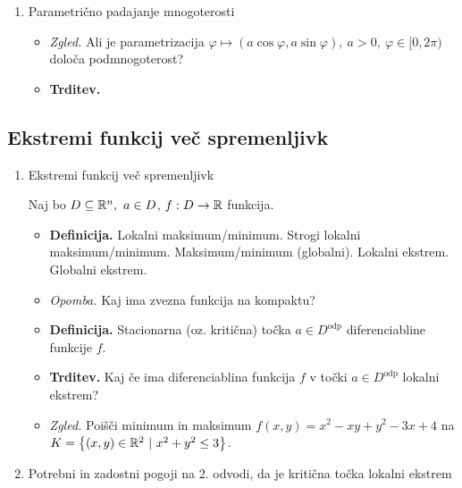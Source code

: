 \begin{enumerate}
    \item Parametrično padajanje mnogoterosti
    \begin{itemize}
        \item \colorbox{yellow!30}{\emph{Zgled.}} Ali je parametrizacija $\varphi \mapsto (a \cos \varphi, a \sin \varphi), \ a > 0, \ \varphi \in [0, 2 \pi)$ določa podmnogoterost?
        \item \colorbox{blue!30}{\textbf{Trditev.}}
    \end{itemize}
\end{enumerate}

\newpage
\subsection{Ekstremi funkcij več spremenljivk}
\begin{enumerate}
    \item Ekstremi funkcij več spremenljivk
    
    Naj bo $D \subseteq \mathbb{R}^n, \ a \in D$, $f: D \to \mathbb{R}$ funkcija.
    
    \begin{itemize}
        \item \colorbox{purple!30}{\textbf{Definicija.}} Lokalni maksimum/minimum. Strogi lokalni maksimum/minimum. Maksimum/minimum (globalni). Lokalni ekstrem. Globalni ekstrem.
        \item \colorbox{yellow!30}{\emph{Opomba.}} Kaj ima zvezna funkcija na kompaktu?
        \item \colorbox{purple!30}{\textbf{Definicija.}} Stacionarna (oz. kritična) točka $a \in D^\text{odp}$ diferenciabline funkcije $f$.
        \item \colorbox{blue!30}{\textbf{Trditev.}} Kaj če ima diferenciablina funkcija $f$ v točki $a \in D^\text{odp}$ lokalni ekstrem?
        \item \colorbox{yellow!30}{\emph{Zgled.}} Poišči minimum in maksimum $f(x,y) = x^2 - xy + y^2 -3x +4$ na $K = \left\{(x, y) \in \mathbb{R}^2 \ | \ x^2+y^2 \leq 3\right\}$.
    \end{itemize}    

    \item Potrebni in zadostni pogoji na 2. odvodi, da je kritična točka lokalni ekstrem
    

\end{enumerate}
